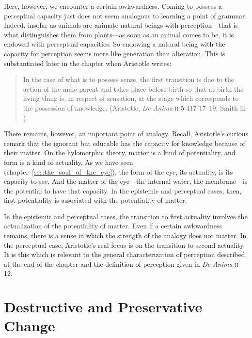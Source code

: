 Here, however, we encounter a certain awkwardness. Coming to possess a perceptual capacity just does not seem analogous to learning a point of grammar. Indeed, insofar as animals are animate natural beings with perception---that is what distinguishes them from plants---as soon as an animal comes to be, it is endowed with perceptual capacities. So endowing a natural being with the capacity for perception seems more like generation than alteration. This is substantiated later in the chapter when Aristotle writes:
\begin{quote}
	In the case of what is to possess sense, the first transition is due to the action of the male parent and takes place before birth so that at birth the living thing is, in respect of sensation, at the stage which corresponds to the possession of knowledge. (Aristotle, \emph{De Anima} \textsc{ii} 5 417\( ^{b} \)17--19; Smith in \citealt[31]{Barnes:1984uq})
\end{quote}
There remains, however, an important point of analogy. Recall, Aristotle's curious remark that the ignorant but educable has the capacity for knowledge because of their matter. On the hylomorphic theory, matter is a kind of potentiality, and form is a kind of actuality. As we have seen (chapter~\ref{sec:the_soul_of_the_eye}), the form of the eye, its actuality, is its capacity to see. And the matter of the eye---the internal water, the membrane---is the potential to have that capacity. In the epistemic and perceptual cases, then, first potentiality is associated with the potentiality of matter. 

In the epistemic and perceptual cases, the transition to first actuality involves the actualization of the potentiality of matter. Even if a certain awkwardness remains, there is a sense in which the strength of the analogy does not matter. In the perceptual case, Aristotle's real focus is on the transition to second actuality. It is this which is relevant to the general characterization of perception described at the end of the chapter and the definition of perception given in \emph{De Anima} \textsc{ii} 12.


\section{Destructive and Preservative Change} %
\label{sec:destructive_and_preservative_change}

